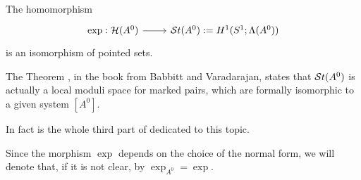 \begin{center}
  \begin{minipage}[t]{0.8\textwidth}
    \begin{tthm}\label{thm:mainThm1}
      The homomorphism
      \[ \begin{tikzcd}
          \exp:\cH(A^0) \rar& \St(A^0):=H^1(S^1;\Lambda(A^0))
      \end{tikzcd} \]
      is an isomorphism of pointed sets.
    \end{tthm}
  \end{minipage}
\end{center}
\begin{rem}
  The Theorem \cite[Thm.III.1.1.2]{babbitt1989local}, in the book from
  Babbitt and Varadarajan, states that $\mathcal{S}{}t(A^0)$ is actually a local moduli
  space for marked pairs, which are formally isomorphic to a given system
  $[A^0]$.
  \begin{comment}
    This means that
    \begin{itemize}
      \item the morphism property,
      \item the criterion of equivalence and
      \item the existence of universal families
    \end{itemize}
    are satisfied (cf.\ \cite[169]{babbitt1989local}).
  \end{comment}
  In fact is the whole third part of \cite{babbitt1989local} dedicated to this
  topic.
\end{rem}
Since the morphism $\exp$ depends on the choice of the normal form, we will
denote that, if it is not clear, by $\exp_{A^0}=\exp$.
